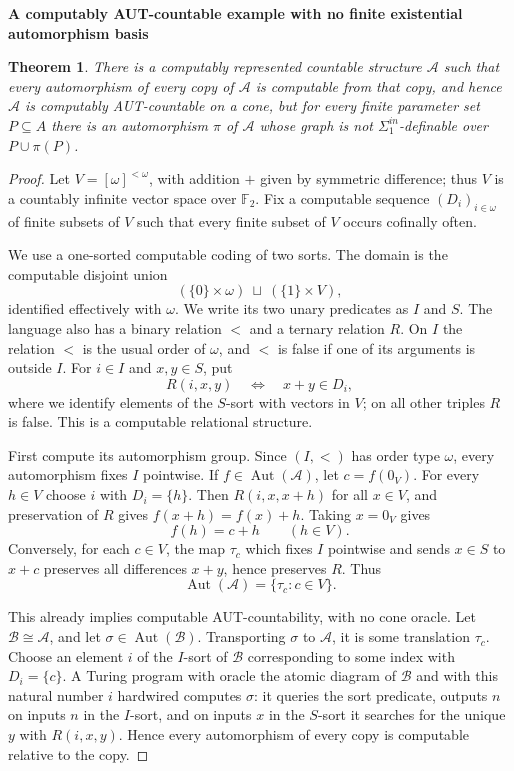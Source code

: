 \documentclass[12pt]{article}
\newtheorem{theorem}{Theorem}
\newcommand{\Aut}{\operatorname{Aut}}
\begin{document}
\begin{center}
{\bf A computably AUT-countable example with no finite existential
automorphism basis}
\end{center}

\begin{theorem}
There is a computably represented countable structure $\mathcal A$ such
that every automorphism of every copy of $\mathcal A$ is computable from
that copy, and hence $\mathcal A$ is computably AUT-countable on a cone,
but for every finite parameter set $P\subseteq A$ there is an
automorphism $\pi$ of $\mathcal A$ whose graph is not
$\Sigma^{in}_1$-definable over $P\cup\pi(P)$.
\end{theorem}

\begin{proof}
Let $V=[\omega]^{<\omega}$, with addition $+$ given by symmetric
difference; thus $V$ is a countably infinite vector space over
$\mathbb F_2$.  Fix a computable sequence $(D_i)_{i\in\omega}$ of finite
subsets of $V$ such that every finite subset of $V$ occurs cofinally
often.

We use a one-sorted computable coding of two sorts.  The domain is the
computable disjoint union
\[
        (\{0\}\times\omega)\ \sqcup\ (\{1\}\times V),
\]
identified effectively with $\omega$.  We write its two unary predicates
as $I$ and $S$.  The language also has a binary relation $<$ and a
ternary relation $R$.  On $I$ the relation $<$ is the usual order of
$\omega$, and $<$ is false if one of its arguments is outside $I$.  For
$i\in I$ and $x,y\in S$, put
\[
        R(i,x,y)\quad\Longleftrightarrow\quad x+y\in D_i,
\]
where we identify elements of the $S$-sort with vectors in $V$; on all
other triples $R$ is false.  This is a computable relational structure.

First compute its automorphism group.  Since $(I,<)$ has order type
$\omega$, every automorphism fixes $I$ pointwise.  If
$f\in\Aut(\mathcal A)$, let $c=f(0_V)$.  For every $h\in V$ choose $i$
with $D_i=\{h\}$.  Then $R(i,x,x+h)$ for all $x\in V$, and preservation
of $R$ gives $f(x+h)=f(x)+h$.  Taking $x=0_V$ gives
\[
        f(h)=c+h  \qquad(h\in V).
\]
Conversely, for each $c\in V$, the map $\tau_c$ which fixes $I$
pointwise and sends $x\in S$ to $x+c$ preserves all differences $x+y$,
hence preserves $R$.  Thus
\[
        \Aut(\mathcal A)=\{\tau_c:c\in V\}.
\]

This already implies computable AUT-countability, with no cone oracle.
Let $\mathcal B\cong\mathcal A$, and let $\sigma\in\Aut(\mathcal B)$.
Transporting $\sigma$ to $\mathcal A$, it is some translation $\tau_c$.
Choose an element $i$ of the $I$-sort of $\mathcal B$ corresponding to
some index with $D_i=\{c\}$.  A Turing program with oracle the atomic
diagram of $\mathcal B$ and with this natural number $i$ hardwired
computes $\sigma$: it queries the sort predicate, outputs $n$ on inputs
$n$ in the $I$-sort, and on inputs $x$ in the $S$-sort it searches for
the unique $y$ with $R(i,x,y)$.  Hence every automorphism of every copy
is computable relative to the copy.


\end{proof}
\end{document}
